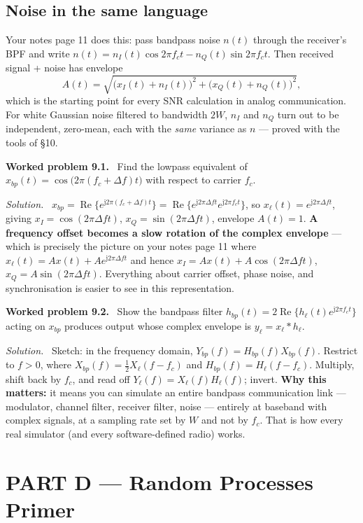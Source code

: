 \documentclass[11pt,a4paper]{article}
\newcommand{\ii}{\mathrm{j}}
\newenvironment{worked}[1]{\par\vspace{4pt}\noindent\textbf{\color{warmred}Worked problem #1.}\ \ignorespaces}{\par\vspace{4pt}}
\newcommand{\soln}{\par\vspace{2pt}\noindent\textit{Solution.}\ \ignorespaces}
\begin{document}
\subsection{Noise in the same language}
Your notes page 11 does this: pass bandpass noise $n(t)$ through the receiver's BPF and write
$n(t)=n_I(t)\cos2\pi f_ct-n_Q(t)\sin2\pi f_ct$. Then received signal + noise has envelope
\[
A(t)=\sqrt{\big(x_I(t)+n_I(t)\big)^2+\big(x_Q(t)+n_Q(t)\big)^2},
\]
which is the starting point for every SNR calculation in analog communication. For white Gaussian noise
filtered to bandwidth $2W$, $n_I$ and $n_Q$ turn out to be independent, zero-mean, each with the \emph{same}
variance as $n$ --- proved with the tools of \S10.

\begin{worked}{9.1}
Find the lowpass equivalent of $x_{bp}(t)=\cos\big(2\pi(f_c+\Delta f)t\big)$ with respect to carrier $f_c$.
\end{worked}
\soln
$x_{bp}=\operatorname{Re}\{e^{\ii2\pi(f_c+\Delta f)t}\}=\operatorname{Re}\{e^{\ii2\pi\Delta f t}e^{\ii2\pi f_ct}\}$,
so $x_\ell(t)=e^{\ii2\pi\Delta ft}$, giving $x_I=\cos(2\pi\Delta ft)$, $x_Q=\sin(2\pi\Delta ft)$, envelope
$A(t)=1$. \textbf{A frequency offset becomes a slow rotation of the complex envelope} --- which is precisely
the picture on your notes page 11 where $x_\ell(t)=Ax(t)+Ae^{\ii2\pi\Delta ft}$ and hence
$x_I=Ax(t)+A\cos(2\pi\Delta ft)$, $x_Q=A\sin(2\pi\Delta ft)$. Everything about carrier offset, phase noise,
and synchronisation is easier to see in this representation.

\begin{worked}{9.2}
Show the bandpass filter $h_{bp}(t)=2\operatorname{Re}\{h_\ell(t)e^{\ii2\pi f_ct}\}$ acting on
$x_{bp}$ produces output whose complex envelope is $y_\ell=x_\ell * h_\ell$.
\end{worked}
\soln
Sketch: in the frequency domain, $Y_{bp}(f)=H_{bp}(f)X_{bp}(f)$. Restrict to $f>0$, where
$X_{bp}(f)=\tfrac12X_\ell(f-f_c)$ and $H_{bp}(f)=H_\ell(f-f_c)$. Multiply, shift back by $f_c$, and read off
$Y_\ell(f)=X_\ell(f)H_\ell(f)$; invert. \textbf{Why this matters:} it means you can simulate an entire
bandpass communication link --- modulator, channel filter, receiver filter, noise --- entirely at baseband
with complex signals, at a sampling rate set by $W$ and not by $f_c$. That is how every real simulator (and
every software-defined radio) works.
\section*{\color{keyblue}PART D --- Random Processes Primer}
\end{document}
